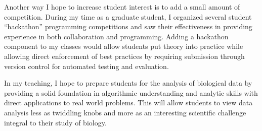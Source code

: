 \documentclass[12pt]{article}
\begin{document}
  Another way I hope to increase student interest is to add a small amount of competition. During my time as a graduate student, I organized several student ``hackathon'' programming competitions and saw their effectiveness in providing experience in both collaboration and programming. Adding a hackathon component to my classes would allow students put theory into practice while allowing direct enforcement of best practices by requiring submission through version control for automated testing and evaluation. 
 
In my teaching, I hope to prepare students for the analysis of biological data by providing a solid foundation in algorithmic understanding and analytic skills with direct applications to real world problems. This will allow students to view data analysis less as twiddling knobs and more as an interesting scientific challenge integral to their study of biology.

 
\end{document}
